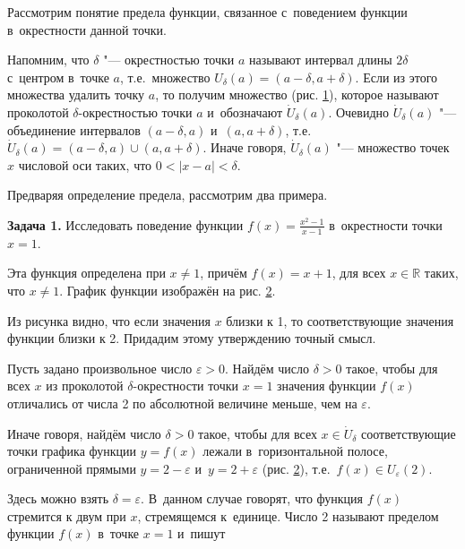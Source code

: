 
Рассмотрим понятие предела функции, связанное с~поведением функции в~окрестности
данной точки.

Напомним, что $\delta$ "--- окрестностью точки $a$ называют интервал длины
$2\delta$ с~центром в~точке $a$, т.е.\ множество 
$U_{\delta}(a) = (a - \delta, a + \delta)$.
Если из этого множества удалить точку $a$, то получим множество
(рис. \ref{fig:4_1_1_1}), которое называют проколотой $\delta$-окрестностью точки $a$
и~обозначают $\dot U_{\delta}(a)$.
Очевидно $\dot U_{\delta}(a)$ "--- объединение интервалов
$(a - \delta, a)$ и~$(a, a + \delta)$, т.е.\
$\dot U_{\delta}(a) = (a-\delta, a) \cup (a, a+\delta)$.
Иначе говоря, $\dot U_{\delta}(a)$ "--- множество точек $x$ числовой оси таких,
что $0 < |x - a| < \delta$.

\begin{figure}\label{fig:4_1_1_1}
\end{figure}

Предваряя определение предела, рассмотрим два примера.

\textbf{Задача 1.}\label{ex:4_1_1_1} Исследовать поведение функции
$\displaystyle f(x) = \frac{x^{2}-1}{x-1}$ в~окрестности точки $x=1$.

Эта функция определена при $x \ne 1$, причём $f(x) = x + 1$,
для всех $x \in \mathbb{R}$ таких, что $x \ne 1$.
График функции изображён на рис. \ref{fig:4_1_1_2}.

\begin{figure}\label{fig:4_1_1_2}
\end{figure}

Из рисунка видно, что если значения $x$ близки к 1, то соответствующие
значения функции близки к 2. Придадим этому утверждению точный смысл.

Пусть задано произвольное число $\varepsilon > 0$. Найдём число $\delta > 0$
такое, чтобы для всех $x$ из проколотой $\delta$-окрестности точки $x = 1$
значения функции $f(x)$ отличались от числа 2 по абсолютной величине меньше,
чем на $\varepsilon$.

Иначе говоря, найдём число $\delta > 0$ такое, чтобы для всех $x \in \dot U_{\delta}$
соответствующие точки графика функции $y = f(x)$ лежали в~горизонтальной полосе,
ограниченной прямыми $y = 2 - \varepsilon$ и~$y = 2 + \varepsilon$
(рис. \ref{fig:4_1_1_2}), т.е.\ $f(x) \in U_{\varepsilon}(2)$.

Здесь можно взять $\delta = \varepsilon$. В~данном случае говорят, что функция
$f(x)$ стремится к двум при $x$, стремящемся к~единице.
Число 2 называют пределом функции $f(x)$ в~точке $x=1$ и~пишут

